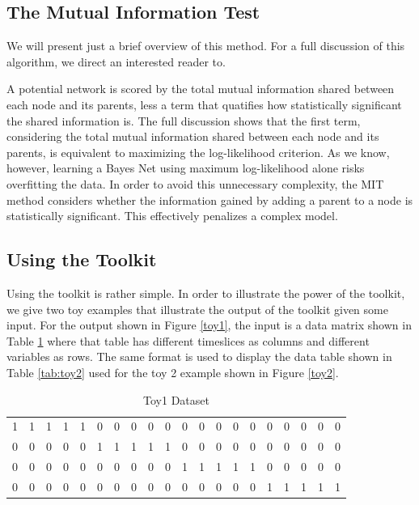 \documentclass{article}
\begin{document}
\subsection{The Mutual Information Test}

We will present just a brief overview of this method. For a full discussion of 
this algorithm, we direct an interested reader to.\cite{vinh11} \par

A potential network is scored by the total mutual information shared between 
each node and its parents, less a term that quatifies how statistically 
significant the shared information is. The full discussion shows that the 
first term, considering the total mutual information shared between each node 
and its parents, is equivalent to maximizing the log-likelihood criterion. 
As we know, however, learning a Bayes Net using maximum log-likelihood alone 
risks overfitting the data. In order to avoid this unnecessary complexity, the 
MIT method considers whether the information gained by adding a parent to a 
node is statistically significant. This effectively penalizes a complex 
model. \par

\subsection{Using the Toolkit}

Using the toolkit is rather simple. In order to illustrate the power of the 
toolkit, we give two toy examples that illustrate the output of the toolkit 
given some input. For the output shown in Figure \ref{toy1}, the input is 
a data matrix shown in Table \ref{tab:toy1} where that table has different 
timeslices as columns and different variables as rows. The same format is used
to display the data table shown in Table \ref{tab:toy2} used for the toy 2 
example shown in Figure \ref{toy2}. 

\begin{table}[h]
  \centering
  \begin{tabular}{c |  c | c| c|  c |c| c| c| c| c| c| c| c|c|c|c|c|c|c|c}
    \hline
    1 & 1 & 1 & 1 & 1 & 0 & 0 & 0 & 0 & 0 & 0 & 0 & 0 & 0 & 0 & 0 &0&0&0& 0 \\
    0 & 0 & 0 & 0 & 0 & 1 & 1 & 1 & 1 & 1 & 0 & 0 & 0 & 0 & 0 & 0 &0&0&0& 0 \\
    0 & 0 & 0 & 0 & 0 & 0 & 0 & 0 & 0 & 0 & 1 & 1 & 1 & 1 & 1 & 0 &0&0&0& 0 \\
    0 & 0 & 0& 0 & 0 & 0 & 0 & 0 & 0 & 0 & 0 & 0 & 0 & 0 & 0 & 1 &1&1&1& 1 \\
    \hline
  \end{tabular}
    \caption{Toy1 Dataset}
    \label{tab:toy1}

\end{table}
\end{document}
